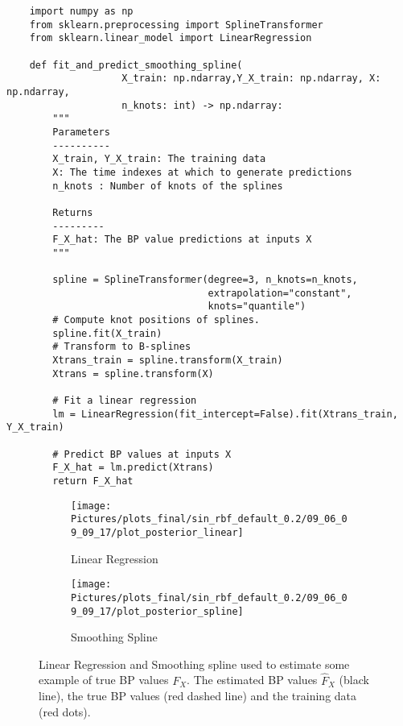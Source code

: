 %
\begin{code}
\label{code:code:smoothing-spline}
\begin{verbatim}
    import numpy as np
    from sklearn.preprocessing import SplineTransformer
    from sklearn.linear_model import LinearRegression

    def fit_and_predict_smoothing_spline(
                    X_train: np.ndarray,Y_X_train: np.ndarray, X: np.ndarray,
                    n_knots: int) -> np.ndarray:
        """
        Parameters
        ----------
        X_train, Y_X_train: The training data
        X: The time indexes at which to generate predictions
        n_knots : Number of knots of the splines

        Returns
        ---------
        F_X_hat: The BP value predictions at inputs X
        """

        spline = SplineTransformer(degree=3, n_knots=n_knots,
                                   extrapolation="constant",
                                   knots="quantile")
        # Compute knot positions of splines.
        spline.fit(X_train)
        # Transform to B-splines
        Xtrans_train = spline.transform(X_train)
        Xtrans = spline.transform(X)

        # Fit a linear regression
        lm = LinearRegression(fit_intercept=False).fit(Xtrans_train, Y_X_train)

        # Predict BP values at inputs X
        F_X_hat = lm.predict(Xtrans)
        return F_X_hat

\end{verbatim}

\end{code}


\begin{figure}[!ht]
\centering
\begin{subfigure}{.5\textwidth}
    \centering
    \texttt{[image: 
        Pictures/plots\_final/sin\_rbf\_default\_0.2/09\_06\_09\_09\_17/plot\_posterior\_linear]}
    \caption{Linear Regression}
    \label{fig:post-linear}
\end{subfigure}\hfill
\begin{subfigure}{.5\textwidth}
    \centering
    \texttt{[image: 
        Pictures/plots\_final/sin\_rbf\_default\_0.2/09\_06\_09\_09\_17/plot\_posterior\_spline]}
    \caption{Smoothing Spline}
    \label{fig:post-spline}
\end{subfigure}
\caption{Linear Regression and Smoothing spline used
to estimate some example of true BP values $F_X$. The estimated BP values $\hat{F}_X$ (black line), the
        true BP values (red dashed line) and the training data (red dots).}
\label{fig:regression-example}
\end{figure}

